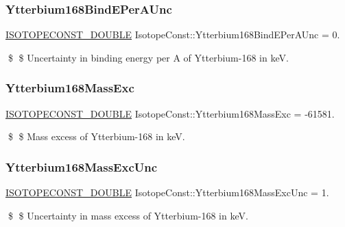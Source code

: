 \subsubsection{\texorpdfstring{Ytterbium168\+Bind\+E\+Per\+A\+Unc}{Ytterbium168BindEPerAUnc}}
{\footnotesize\ttfamily \mbox{\hyperlink{group___isotope_const-_macros_ga8f45a7272ce02c0b4c65c44636ed719a}{I\+S\+O\+T\+O\+P\+E\+C\+O\+N\+S\+T\+\_\+\+D\+O\+U\+B\+LE}} Isotope\+Const\+::\+Ytterbium168\+Bind\+E\+Per\+A\+Unc = 0.}

\$ \$ Uncertainty in binding energy per A of Ytterbium-\/168 in keV. \mbox{\label{group___isotope_const-_ytterbium-_yb168_ga68a936640a1fb551f8d7659f51902506}} 
\subsubsection{\texorpdfstring{Ytterbium168\+Mass\+Exc}{Ytterbium168MassExc}}
{\footnotesize\ttfamily \mbox{\hyperlink{group___isotope_const-_macros_ga8f45a7272ce02c0b4c65c44636ed719a}{I\+S\+O\+T\+O\+P\+E\+C\+O\+N\+S\+T\+\_\+\+D\+O\+U\+B\+LE}} Isotope\+Const\+::\+Ytterbium168\+Mass\+Exc = -\/61581.}

\$ \$ Mass excess of Ytterbium-\/168 in keV. \mbox{\label{group___isotope_const-_ytterbium-_yb168_ga4c8df7cba8f6c9eccde7430824f9142c}} 
\subsubsection{\texorpdfstring{Ytterbium168\+Mass\+Exc\+Unc}{Ytterbium168MassExcUnc}}
{\footnotesize\ttfamily \mbox{\hyperlink{group___isotope_const-_macros_ga8f45a7272ce02c0b4c65c44636ed719a}{I\+S\+O\+T\+O\+P\+E\+C\+O\+N\+S\+T\+\_\+\+D\+O\+U\+B\+LE}} Isotope\+Const\+::\+Ytterbium168\+Mass\+Exc\+Unc = 1.}

\$ \$ Uncertainty in mass excess of Ytterbium-\/168 in keV. \mbox{\label{group___isotope_const-_ytterbium-_yb168_ga2d826da914d4c5ddce5bf2aa70d0f75c}} 
